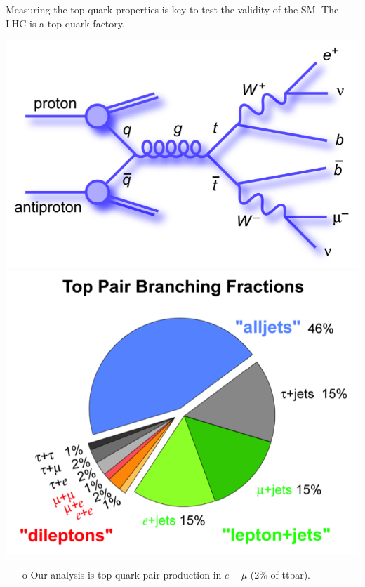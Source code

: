\begin{frame}{Measuring the top-quark properties is key to test the validity of the SM. The LHC is a top-quark factory.}
\begin{enumerate}
\end{enumerate}
\centering
\includegraphics[height=0.3\textheight]{./plots/ttbar_4.png}
\includegraphics[height=0.3\textheight]{./plots/ttbar_5.png}
\begin{enumerate}
\item[o] Our analysis is top-quark pair-production in $e-\mu$ (2\% of ttbar).
\end{enumerate}
\end{frame}
\clearpage


